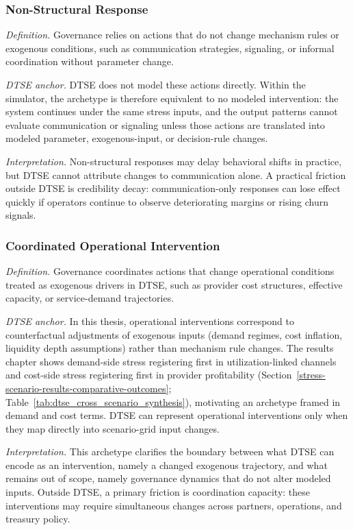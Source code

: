 \subsubsection*{Non-Structural Response}
\emph{Definition.} Governance relies on actions that do not change mechanism rules or exogenous conditions, such as communication strategies, signaling, or informal coordination without parameter change.

\emph{DTSE anchor.} DTSE does not model these actions directly. Within the simulator, the archetype is therefore equivalent to no modeled intervention: the system continues under the same stress inputs, and the output patterns cannot evaluate communication or signaling unless those actions are translated into modeled parameter, exogenous-input, or decision-rule changes.

\emph{Interpretation.} Non-structural responses may delay behavioral shifts in practice, but DTSE cannot attribute changes to communication alone. A practical friction outside DTSE is credibility decay: communication-only responses can lose effect quickly if operators continue to observe deteriorating margins or rising churn signals.

\subsubsection*{Coordinated Operational Intervention}
\emph{Definition.} Governance coordinates actions that change operational conditions treated as exogenous drivers in DTSE, such as provider cost structures, effective capacity, or service-demand trajectories.

\emph{DTSE anchor.} In this thesis, operational interventions correspond to counterfactual adjustments of exogenous inputs (demand regimes, cost inflation, liquidity depth assumptions) rather than mechanism rule changes. The results chapter shows demand-side stress registering first in utilization-linked channels and cost-side stress registering first in provider profitability (Section~\ref{stress-scenario-results-comparative-outcomes}; Table~\ref{tab:dtse_cross_scenario_synthesis}), motivating an archetype framed in demand and cost terms. DTSE can represent operational interventions only when they map directly into scenario-grid input changes.

\emph{Interpretation.} This archetype clarifies the boundary between what DTSE can encode as an intervention, namely a changed exogenous trajectory, and what remains out of scope, namely governance dynamics that do not alter modeled inputs. Outside DTSE, a primary friction is coordination capacity: these interventions may require simultaneous changes across partners, operations, and treasury policy.

